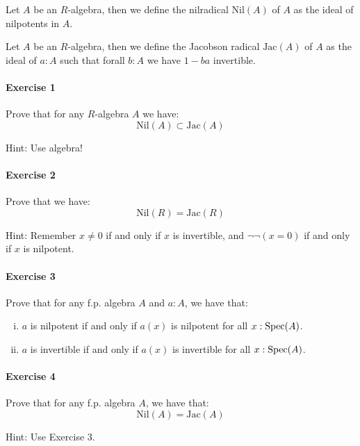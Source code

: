 \begin{definition}
Let $A$ be an $R$-algebra, then we define the nilradical $\mathrm{Nil}(A)$ of $A$ as the ideal of nilpotents in $A$.
\end{definition}

\begin{definition}
Let $A$ be an $R$-algebra, then we define the Jacobson radical $\mathrm{Jac}(A)$ of $A$ as the ideal of $a:A$ such that forall $b:A$ we have $1-ba$ invertible.
\end{definition}

\paragraph{Exercise 1}{
Prove that for any $R$-algebra $A$ we have:
\[\mathrm{Nil}(A) \subset \mathrm{Jac}(A)\]
}

Hint: Use algebra!

\paragraph{Exercise 2}{
Prove that we have:
\[\mathrm{Nil}(R) = \mathrm{Jac}(R)\]
}

Hint: Remember $x\not=0$ if and only if $x$ is invertible, and $\neg\neg(x=0)$ if and only if $x$ is nilpotent. 

\paragraph{Exercise 3}{
Prove that for any f.p. algebra $A$ and $a:A$, we have that:

\begin{enumerate}[(i)]
\item $a$ is nilpotent if and only if $a(x)$ is nilpotent for all $x:\operatorname{Spec}(A)$.
\item $a$ is invertible if and only if $a(x)$ is invertible for all $x:\operatorname{Spec}(A)$.
\end{enumerate}
}

\paragraph{Exercise 4}{
Prove that for any f.p. algebra $A$, we have that:
\[\mathrm{Nil}(A) = \mathrm{Jac}(A)\]
}

Hint: Use Exercise 3.
